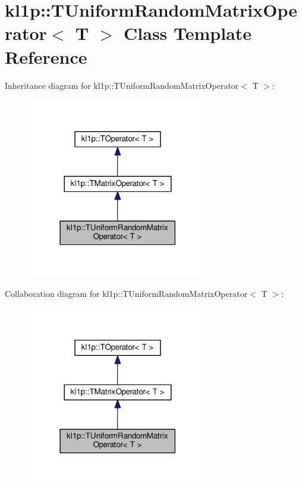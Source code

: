 \hypertarget{classkl1p_1_1TUniformRandomMatrixOperator}{}\section{kl1p\+:\+:T\+Uniform\+Random\+Matrix\+Operator$<$ T $>$ Class Template Reference}
\label{classkl1p_1_1TUniformRandomMatrixOperator}


Inheritance diagram for kl1p\+:\+:T\+Uniform\+Random\+Matrix\+Operator$<$ T $>$\+:
\nopagebreak
\begin{figure}[H]
\begin{center}
\leavevmode
\includegraphics[width=225pt]{classkl1p_1_1TUniformRandomMatrixOperator__inherit__graph}
\end{center}
\end{figure}


Collaboration diagram for kl1p\+:\+:T\+Uniform\+Random\+Matrix\+Operator$<$ T $>$\+:
\nopagebreak
\begin{figure}[H]
\begin{center}
\leavevmode
\includegraphics[width=225pt]{classkl1p_1_1TUniformRandomMatrixOperator__coll__graph}
\end{center}
\end{figure}
